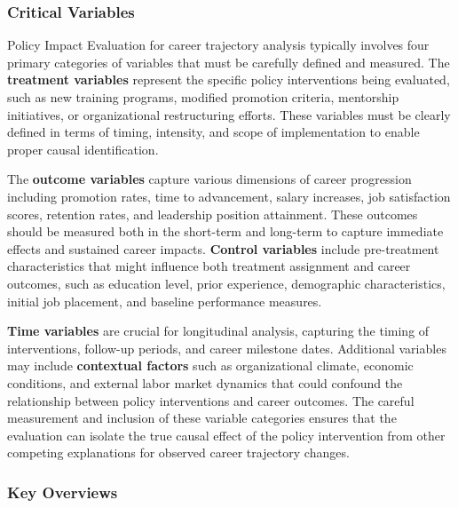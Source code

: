 \documentclass[main.tex]{subfiles}
\begin{document}
\subsubsection{Critical Variables}

Policy Impact Evaluation for career trajectory analysis typically involves four primary categories of variables that must be carefully defined and measured\parencite{impact_eval_methods,quasi_exp_worldbank}. The \textbf{treatment variables} represent the specific policy interventions being evaluated, such as new training programs, modified promotion criteria, mentorship initiatives, or organizational restructuring efforts. These variables must be clearly defined in terms of timing, intensity, and scope of implementation to enable proper causal identification.

The \textbf{outcome variables} capture various dimensions of career progression including promotion rates, time to advancement, salary increases, job satisfaction scores, retention rates, and leadership position attainment\parencite{army_indicators,career_pathways_meta}. These outcomes should be measured both in the short-term and long-term to capture immediate effects and sustained career impacts. \textbf{Control variables} include pre-treatment characteristics that might influence both treatment assignment and career outcomes, such as education level, prior experience, demographic characteristics, initial job placement, and baseline performance measures\parencite{army_indicators,causal_inference_book}.

\textbf{Time variables} are crucial for longitudinal analysis, capturing the timing of interventions, follow-up periods, and career milestone dates\parencite{quasi_experimental,quasi_exp_worldbank}. Additional variables may include \textbf{contextual factors} such as organizational climate, economic conditions, and external labor market dynamics that could confound the relationship between policy interventions and career outcomes. The careful measurement and inclusion of these variable categories ensures that the evaluation can isolate the true causal effect of the policy intervention from other competing explanations for observed career trajectory changes.

\subsubsection{Key Overviews}

\end{document}
